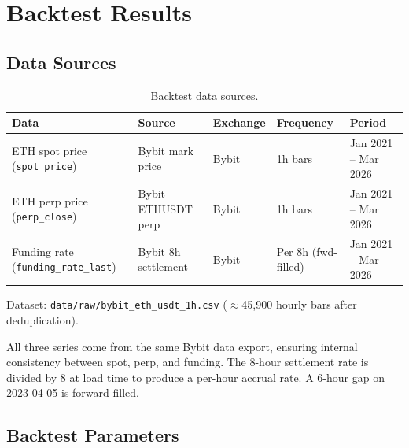 \documentclass[11pt,a4paper]{article}
\begin{document}
\section{Backtest Results}

\subsection{Data Sources}

\begin{table}[h!]
\centering
\caption{Backtest data sources.}
\begin{tabular}{@{}lllll@{}}
\toprule
\textbf{Data} & \textbf{Source} & \textbf{Exchange} & \textbf{Frequency} & \textbf{Period} \\
\midrule
ETH spot price (\texttt{spot\_price})
    & Bybit mark price & Bybit & 1h bars & Jan 2021 -- Mar 2026 \\
ETH perp price (\texttt{perp\_close})
    & Bybit ETHUSDT perp & Bybit & 1h bars & Jan 2021 -- Mar 2026 \\
Funding rate (\texttt{funding\_rate\_last})
    & Bybit 8h settlement & Bybit & Per 8h (fwd-filled) & Jan 2021 -- Mar 2026 \\
\bottomrule
\end{tabular}
\end{table}

Dataset: \texttt{data/raw/bybit\_eth\_usdt\_1h.csv} ($\approx$45,900 hourly bars after deduplication).

All three series come from the same Bybit data export, ensuring internal consistency between spot, perp, and funding. The 8-hour settlement rate is divided by 8 at load time to produce a per-hour accrual rate. A 6-hour gap on 2023-04-05 is forward-filled.

\subsection{Backtest Parameters}
\end{document}
